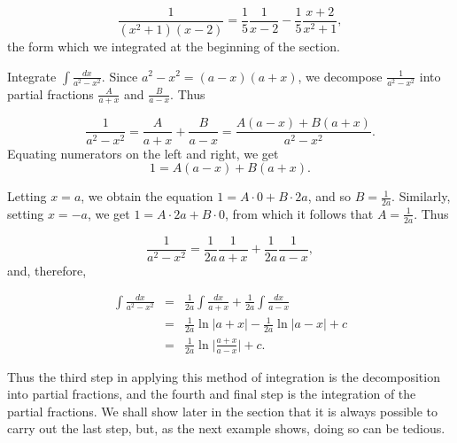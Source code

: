 $$
\frac{1}{(x^2+ 1)(x - 2)} 
= \frac{1}{ 5}\frac{1}{ x-2} - \frac{1}{ 5} \frac{x + 2}{x^2+ 1},
$$
\noindent the form which we integrated at the beginning of the section.

\begin{example}
Integrate $\int \frac{dx}{a^2 - x^2}$. Since $a^2 - x^2 = (a - x)(a + x)$, we
decompose $\frac{1}{a^2 - x^2}$ into partial fractions $\frac{A}{a + x}$ and $\frac{B}{a - x}$. Thus 

$$
\frac{1}{a^2 - x^2} =  \frac{A}{a + x} + \frac{B}{a - x} 
= \frac{A(a - x) + B(a + x)}{a^2 - x^2}.
$$
\noindent Equating numerators on the left and right, we get
$$
1 = A(a - x) + B(a + x).
$$

Letting $x = a$, we obtain the equation $1 = A \cdot 0 + B \cdot 2a$, and so $B = \frac{1}{2a}$. Similarly, setting $x = - a$, we get $1 = A \cdot 2a 
+ B \cdot 0$, from which it follows that $A = \frac{1}{2a}$. Thus  
 
$$
\frac{1}{a^2 - x^2} = \frac{1}{2a} \frac{1}{a + x} + \frac{1}{2a} \frac{1}{a - x}, 
$$
\noindent and, therefore,

\begin{eqnarray*}
\int \frac{ dx}{a^2 - x^2} 
&=& \frac{1}{2a} \int \frac{dx}{a + x} + \frac{1}{2a} \int \frac{dx}{a - x}\\
&=& \frac{1}{2a} \ln |a + x| - \frac{1}{2a} \ln |a - x| + c \\
&=& \frac{1}{2a} \ln \Big| \frac{a + x}{a - x} \Big|  + c.
\end{eqnarray*}
\end{example}

Thus the third step in applying this method of integration is the decomposition into partial fractions, and the fourth and final step is the integration of the partial fractions. We shall show later in the section that it is always possible to carry out the last step, but, as the next example shows, doing so can be tedious.


